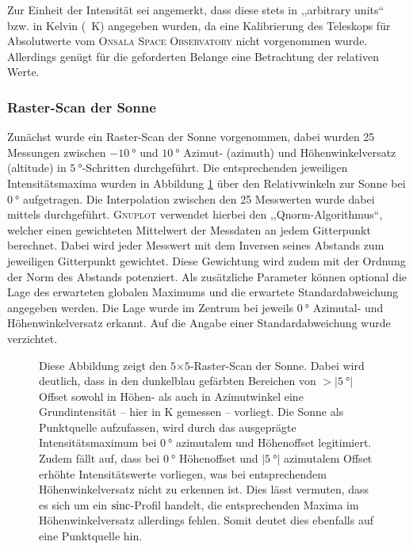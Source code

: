      

    Zur Einheit der Intensität sei angemerkt, dass diese stets in ,,arbitrary units`` bzw. in Kelvin (\SI{}{\kelvin}) angegeben wurden,
    da eine Kalibrierung des Teleskops für Absolutwerte vom \textsc{Onsala Space Observatory} nicht vorgenommen wurde.
    Allerdings genügt für die geforderten Belange eine Betrachtung der relativen Werte.\\

    \subsubsection{Raster-Scan der Sonne}
    Zunächst wurde ein Raster-Scan der Sonne vorgenommen, dabei wurden 25 Messungen zwischen $\SI{-10}{\degree}$ und $\SI{10}{\degree}$ Azimut- (azimuth) und Höhenwinkelversatz (altitude) in $\SI{5}{\degree}$-Schritten durchgeführt.
    Die entsprechenden jeweiligen Intensitätsmaxima wurden in Abbildung \ref{fig:Sonnenabbild} über den Relativwinkeln zur Sonne bei $\SI{0}{\degree}$ aufgetragen. 
    Die Interpolation zwischen den 25 Messwerten wurde dabei mittels  durchgeführt. 
    \textsc{Gnuplot} verwendet hierbei den ,,Qnorm-Algorithmus``, welcher einen gewichteten Mittelwert der Messdaten an jedem Gitterpunkt berechnet. 
    Dabei wird jeder Messwert mit dem Inversen seines Abstands zum jeweiligen Gitterpunkt gewichtet. 
    Diese Gewichtung wird zudem mit der Ordnung der Norm des Abstands potenziert.
    Als zusätzliche Parameter können optional die Lage des erwarteten globalen Maximums und die erwartete Standardabweichung angegeben werden. 
    Die Lage wurde im Zentrum bei jeweils $\SI{0}{\degree}$ Azimutal- und Höhenwinkelversatz erkannt. 
    Auf die Angabe einer Standardabweichung wurde verzichtet.
    \begin{figure}[H]
        \centering
        
        \caption[Raster-Scan der Sonne]{Diese Abbildung zeigt den $5$$\times$$5$-Raster-Scan der Sonne. Dabei wird deutlich, dass in den dunkelblau gefärbten Bereichen von $>\vert \SI{5}{\degree}\vert$ Offset sowohl in Höhen- als auch in Azimutwinkel eine Grundintensität -- hier in \si{\kelvin} gemessen -- vorliegt. Die Sonne als Punktquelle aufzufassen, wird durch das ausgeprägte Intensitätsmaximum bei $\SI{0}{\degree}$ azimutalem und Höhenoffset legitimiert. Zudem fällt auf, dass bei $\SI{0}{\degree}$ Höhenoffset und $\vert\SI{5}{\degree}\vert$ azimutalem Offset erhöhte Intensitätswerte vorliegen, was bei entsprechendem Höhenwinkelversatz nicht zu erkennen ist. Dies lässt vermuten, dass es sich um ein $\operatorname{sinc}$-Profil handelt, die entsprechenden Maxima im Höhenwinkelversatz allerdings fehlen. Somit deutet dies ebenfalls auf eine Punktquelle hin.}
        \label{fig:Sonnenabbild}
    \end{figure}
